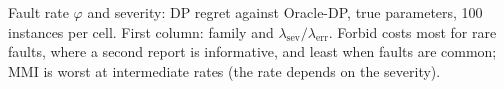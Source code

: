\begin{table}[!htbp]
\centering\scriptsize\setlength{\tabcolsep}{3pt}
\caption{Fault rate $\varphi$ and severity: DP regret against Oracle-DP, true parameters, 100 instances per cell. First column: family and $\lambda_{\mathrm{sev}}/\lambda_{\mathrm{err}}$. Forbid costs most for rare faults, where a second report is informative, and least when faults are common; MMI is worst at intermediate rates (the rate depends on the severity).}
\label{tab:app-grid}
\resizebox{\linewidth}{!}{}
\end{table}
